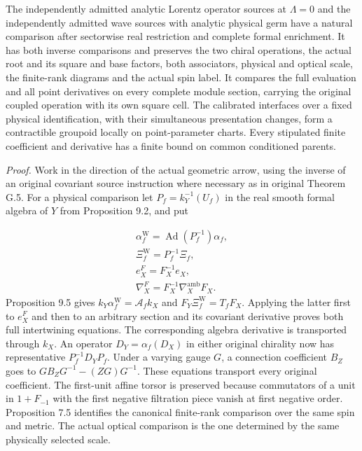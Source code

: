 \documentclass[
  english,
  11pt,
  reqno]{amsart}
\begin{document}
The independently admitted analytic Lorentz operator sources at
\(\Lambda=0\) and the independently admitted wave sources with analytic
physical germ have a natural comparison after sectorwise real
restriction and complete formal enrichment. It has both inverse
comparisons and preserves the two chiral operations, the actual root and
its square and base factors, both associators, physical and optical
scale, the finite-rank diagrams and the actual spin label. It compares
the full evaluation and all point derivatives on every complete module
section, carrying the original coupled operation with its own square
cell. The calibrated interfaces over a fixed physical identification,
with their simultaneous presentation changes, form a contractible
groupoid locally on point-parameter charts. Every stipulated finite
coefficient and derivative has a finite bound on common conditioned
parents.

\emph{Proof.} Work in the direction of the actual geometric arrow, using
the inverse of an original covariant source instruction where necessary
as in original Theorem G.5. For a physical comparison let
\(P_f=k_Y^{-1}(U_f)\) in the real smooth formal algebra of \(Y\) from
Proposition 9.2, and put

\label{eq:analytic-formal-representatives} \[
\begin{gathered}
\alpha_f^{\mathrm W}=\operatorname{Ad}(P_f^{-1})\alpha_f, \\
\Xi_f^{\mathrm W}=P_f^{-1}\Xi_f, \\
e_X^F=F_X^{-1}e_X, \\
\nabla_X^F=F_X^{-1}\nabla_X^{\mathrm{amb}}F_X.
\end{gathered}
\] Proposition 9.5 gives \(k_Y\alpha_f^{\mathrm W}=\mathcal A_f k_X\)
and \(F_Y\Xi_f^{\mathrm W}=T_fF_X\). Applying the latter first to
\(e_X^F\) and then to an arbitrary section and its covariant derivative
proves both full intertwining equations. The corresponding algebra
derivative is transported through \(k_X\). An operator
\(D_Y=\alpha_f(D_X)\) in either original chirality now has
representative \(P_f^{-1}D_Y P_f\). Under a varying gauge \(G\), a
connection coefficient \(B_Z\) goes to \(GB_ZG^{-1}-(ZG)G^{-1}\). These
equations transport every original coefficient. The first-unit affine
torsor is preserved because commutators of a unit in \(1+F_{-1}\) with
the first negative filtration piece vanish at first negative order.
Proposition 7.5 identifies the canonical finite-rank comparison over the
same spin and metric. The actual optical comparison is the one
determined by the same physically selected scale.
\end{document}
